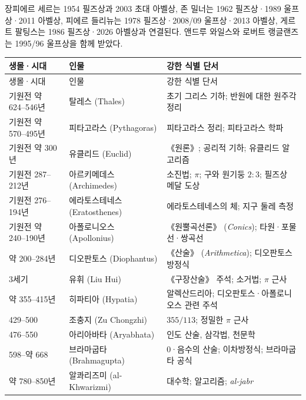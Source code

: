 \begin{fact}[주요 교차 수상]
장피에르 세르는 1954 필즈상과 2003 초대 아벨상, 존 밀너는 1962 필즈상·1989 울프상·2011 아벨상, 피에르 들리뉴는 1978 필즈상·2008/09 울프상·2013 아벨상, 게르트 팔팅스는 1986 필즈상·2026 아벨상과 연결된다. 앤드루 와일스와 로버트 랭글랜즈는 1995/96 울프상을 함께 받았다.
\end{fact}


\begin{center}
\footnotesize
\setlength{\tabcolsep}{2.2pt}
\renewcommand{\arraystretch}{1.08}
\begin{longtable}{@{}L{0.16\textwidth}L{0.24\textwidth}L{0.52\textwidth}@{}}
\toprule
생몰·시대 & 인물 & 강한 식별 단서\\
\midrule
\endfirsthead
\toprule 생몰·시대 & 인물 & 강한 식별 단서\\ \midrule \endhead
\bottomrule\endlastfoot
기원전 약 624--546년 & 탈레스 (Thales) & 초기 그리스 기하; 반원에 대한 원주각 정리\\
기원전 약 570--495년 & 피타고라스 (Pythagoras) & 피타고라스 정리; 피타고라스 학파\\
기원전 약 300년 & 유클리드 (Euclid) & 《원론》; 공리적 기하; 유클리드 알고리즘\\
기원전 287--212년 & 아르키메데스 (Archimedes) & 소진법; $\pi$; 구와 원기둥 $2:3$; 필즈상 메달 도상\\
기원전 276--194년 & 에라토스테네스 (Eratosthenes) & 에라토스테네스의 체; 지구 둘레 측정\\
기원전 약 240--190년 & 아폴로니오스 (Apollonius) & 《원뿔곡선론》 (\textit{Conics}); 타원·포물선·쌍곡선\\
약 200--284년 & 디오판토스 (Diophantus) & 《산술》 (\textit{Arithmetica}); 디오판토스 방정식\\
3세기 & 유휘 (Liu Hui) & 《구장산술》 주석; 소거법; $\pi$ 근사\\
약 355--415년 & 히파티아 (Hypatia) & 알렉산드리아; 디오판토스·아폴로니오스 관련 주석\\
429--500 & 조충지 (Zu Chongzhi) & $355/113$; 정밀한 $\pi$ 근사\\
476--550 & 아리아바타 (Aryabhata) & 인도 산술, 삼각법, 천문학\\
598--약 668 & 브라마굽타 (Brahmagupta) & 0·음수의 산술; 이차방정식; 브라마굽타 공식\\
약 780--850년 & 알콰리즈미 (al-Khwarizmi) & 대수학; 알고리즘; \textit{al-jabr}\\

\end{longtable}
\end{center}
